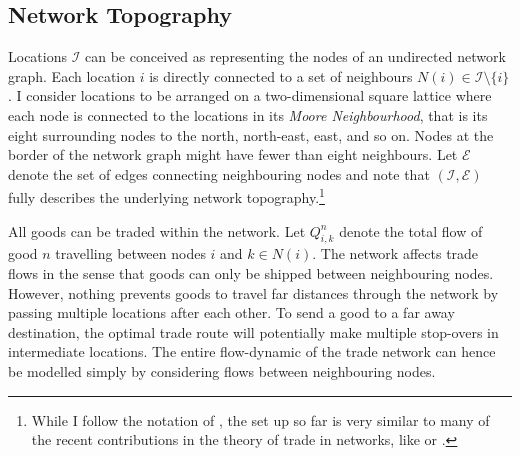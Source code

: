 \documentclass[11pt, oneside]{article}   	%
\begin{document}
\subsection{Network Topography}
Locations $\mathcal{I}$ can be conceived as representing the nodes of an undirected network graph. Each location $i$ is directly connected to a set of neighbours $N(i) \in \mathcal{I} \setminus \{ i\}$. I consider locations to be arranged on a two-dimensional square lattice where each node is connected to the locations in its \emph{Moore Neighbourhood}, that is its eight surrounding nodes to the north, north-east, east, and so on. Nodes at the border of the network graph might have fewer than eight neighbours. Let $\mathcal{E}$ denote the set of edges connecting neighbouring nodes and note that $(\mathcal{I}, \mathcal{E})$ fully describes the underlying network topography.\footnote{While I follow the notation of \cite{fajgelbaum_optimal_2017}, the set up so far is very similar to many of the recent contributions in the theory of trade in networks, like \cite{allen_welfare_2016} or \cite{Galichon_OptimalTransportMethods_2016}.}

All goods can be traded within the network. Let $Q_{i,k}^{n}$ denote the total flow of good $n$ travelling between nodes $i$ and $k \in N(i)$. The network affects trade flows in the sense that goods can only be shipped between neighbouring nodes. However, nothing prevents goods to travel far distances through the network by passing multiple locations after each other. To send a good to a far away destination, the optimal trade route will potentially make multiple stop-overs in intermediate locations. The entire flow-dynamic of the trade network can hence be modelled simply by considering flows between neighbouring nodes.
\end{document}
